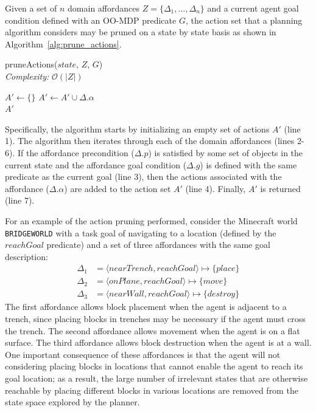 \documentclass[]{article}
\begin{document}
Given a set of $n$ domain affordances $Z = \{\Delta_1, ..., \Delta_n\}$ and a current agent goal condition defined with an OO-MDP predicate $G$, the action set that a planning algorithm considers may be pruned on a state by state basis as shown in Algorithm~\ref{alg:prune_actions}.
\begin{algorithm}
  \caption{pruneActions($state$, $Z$, $G$) \\ {\it Complexity:} $\mathcal{O}(|Z|)$}
  \begin{algorithmic}[1]
    \State $A' \leftarrow \{\}$
    \State $A' \leftarrow A' \cup \Delta.\alpha$
    \EndIf
    \EndFor \\
    \Return $A'$
  \end{algorithmic}
  \label{alg:prune_actions}
\end{algorithm}

Specifically, the algorithm starts
by initializing an empty set of actions $A'$ (line 1). The algorithm then iterates
through each of the domain affordances (lines 2-6). If the affordance
precondition ($\Delta.p$) is satisfied by some set of objects in the current state
and the affordance goal condition ($\Delta.g$) is defined with the same predicate
as the current goal (line 3), then the actions associated with the affordance ($\Delta.\alpha$) are added to the action set $A'$ (line 4). Finally, $A'$ is returned (line 7). 


For an example of the action pruning performed, consider the Minecraft world
\texttt{BRIDGEWORLD} with a task goal of navigating to a location (defined by the $reachGoal$ predicate) and a set of three affordances with the same goal description:
\begin{align*}
\Delta_1 &= \langle nearTrench, reachGoal \rangle \longmapsto \{place\} \\
\Delta_2 &= \langle onPlane, reachGoal \rangle \longmapsto
\{move\} \\
\Delta_3 &= \langle nearWall,
reachGoal \rangle \longmapsto \{destroy \}
\end{align*}
The first affordance allows block placement when the agent is adjacent to
a trench, since placing blocks in trenches may be necessary if the agent
must cross the trench. The second affordance allows movement when the agent
is on a flat surface. The third affordance allows block destruction when
the agent is at a wall. One important consequence of these affordances is that
the agent will not considering placing blocks in locations that cannot
enable the agent to reach its goal location; as a result, the large number of
irrelevant states that are otherwise reachable by placing different blocks
in various locations are removed from the state space explored by the planner.
\end{document}

